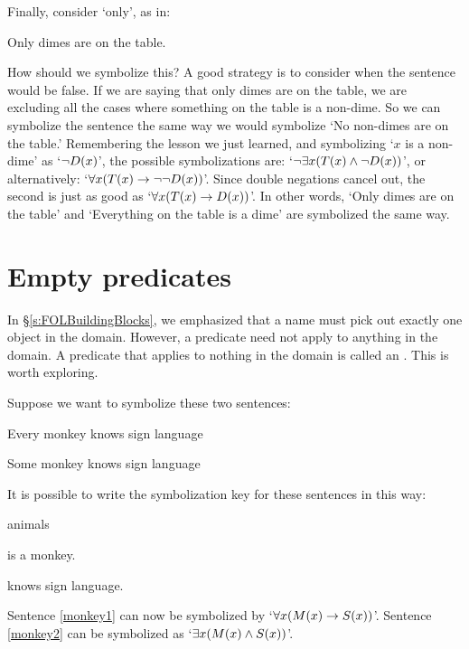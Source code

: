 
Finally, consider `only', as in:
\begin{earg}
	\item[\ex{quan5}] Only dimes are on the table.
\end{earg}
How should we symbolize this?  A good strategy is to consider when the sentence would be false.  If we are saying that only dimes are on the table, we are excluding all the cases where something on the table is a non-dime.  So we can symbolize the sentence the same way we would symbolize `No non-dimes are on the table.' Remembering the lesson we just learned, and symbolizing `$x$ is a non-dime' as `$\neg \mathord{D}(x)$', the possible symbolizations are: `$\neg\exists x(\mathord{T}(x) \wedge \neg \mathord{D}(x))$', or alternatively: `$\forall x(\mathord{T}(x) \rightarrow \neg\neg \mathord{D}(x))$'. Since double negations cancel out, the second is just as good as `$\forall x(\mathord{T}(x) \rightarrow \mathord{D}(x))$'. In other words, `Only dimes are on the table' and `Everything on the table is a dime' are symbolized the same way.


\section{Empty predicates}

In \S\ref{s:FOLBuildingBlocks}, we emphasized that a name must pick out exactly one object in the domain. However, a predicate need not apply to anything in the domain. A predicate that applies to nothing in the domain is called an . This is worth exploring.


Suppose we want to symbolize these two sentences:
	\begin{earg}
		\item[\ex{monkey1}] Every monkey knows sign language
		\item[\ex{monkey2}] Some monkey knows sign language
	\end{earg}
It is possible to write the symbolization key for these sentences in this way:
	\begin{ekey}
		\item[\text{domain}] animals
		\item[\atom{M}{x}]  is a monkey.
		\item[\atom{S}{x}]  knows sign language.
	\end{ekey}
Sentence \ref{monkey1} can now be symbolized by `$\forall x(\mathord{M}(x) \rightarrow \mathord{S}(x))$'. Sentence \ref{monkey2} can be symbolized as `$\exists x(\mathord{M}(x) \wedge \mathord{S}(x))$'.

